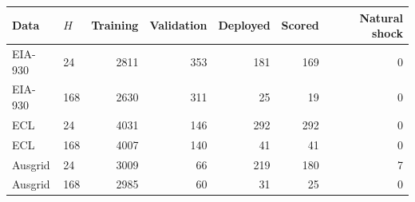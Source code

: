 {
\small
\begin{tabular}{llrrrrr}
\toprule
Data & $H$ & Training & Validation & Deployed & Scored & Natural shock \\
\midrule
EIA-930 & 24 & 2811 & 353 & 181 & 169 & 0 \\
EIA-930 & 168 & 2630 & 311 & 25 & 19 & 0 \\
ECL & 24 & 4031 & 146 & 292 & 292 & 0 \\
ECL & 168 & 4007 & 140 & 41 & 41 & 0 \\
Ausgrid & 24 & 3009 & 66 & 219 & 180 & 7 \\
Ausgrid & 168 & 2985 & 60 & 31 & 25 & 0 \\
\bottomrule
\end{tabular}
}
